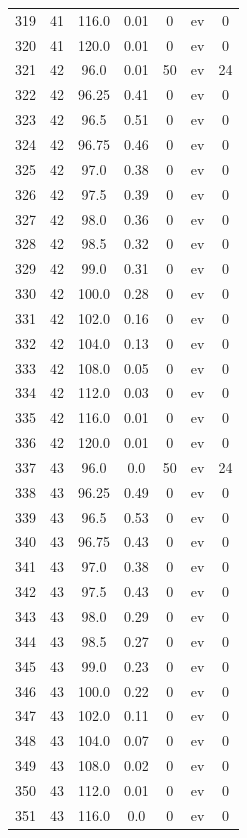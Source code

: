 \documentclass[12pt,a4paper]{article}
\begin{document}
\begin{tabular}{r|cccccc}
	319 & 41 & 116.0 & 0.01 & 0 & ev & 0 \\
	320 & 41 & 120.0 & 0.01 & 0 & ev & 0 \\
	321 & 42 & 96.0 & 0.01 & 50 & ev & 24 \\
	322 & 42 & 96.25 & 0.41 & 0 & ev & 0 \\
	323 & 42 & 96.5 & 0.51 & 0 & ev & 0 \\
	324 & 42 & 96.75 & 0.46 & 0 & ev & 0 \\
	325 & 42 & 97.0 & 0.38 & 0 & ev & 0 \\
	326 & 42 & 97.5 & 0.39 & 0 & ev & 0 \\
	327 & 42 & 98.0 & 0.36 & 0 & ev & 0 \\
	328 & 42 & 98.5 & 0.32 & 0 & ev & 0 \\
	329 & 42 & 99.0 & 0.31 & 0 & ev & 0 \\
	330 & 42 & 100.0 & 0.28 & 0 & ev & 0 \\
	331 & 42 & 102.0 & 0.16 & 0 & ev & 0 \\
	332 & 42 & 104.0 & 0.13 & 0 & ev & 0 \\
	333 & 42 & 108.0 & 0.05 & 0 & ev & 0 \\
	334 & 42 & 112.0 & 0.03 & 0 & ev & 0 \\
	335 & 42 & 116.0 & 0.01 & 0 & ev & 0 \\
	336 & 42 & 120.0 & 0.01 & 0 & ev & 0 \\
	337 & 43 & 96.0 & 0.0 & 50 & ev & 24 \\
	338 & 43 & 96.25 & 0.49 & 0 & ev & 0 \\
	339 & 43 & 96.5 & 0.53 & 0 & ev & 0 \\
	340 & 43 & 96.75 & 0.43 & 0 & ev & 0 \\
	341 & 43 & 97.0 & 0.38 & 0 & ev & 0 \\
	342 & 43 & 97.5 & 0.43 & 0 & ev & 0 \\
	343 & 43 & 98.0 & 0.29 & 0 & ev & 0 \\
	344 & 43 & 98.5 & 0.27 & 0 & ev & 0 \\
	345 & 43 & 99.0 & 0.23 & 0 & ev & 0 \\
	346 & 43 & 100.0 & 0.22 & 0 & ev & 0 \\
	347 & 43 & 102.0 & 0.11 & 0 & ev & 0 \\
	348 & 43 & 104.0 & 0.07 & 0 & ev & 0 \\
	349 & 43 & 108.0 & 0.02 & 0 & ev & 0 \\
	350 & 43 & 112.0 & 0.01 & 0 & ev & 0 \\
	351 & 43 & 116.0 & 0.0 & 0 & ev & 0 \\

\end{tabular}
\end{document}
